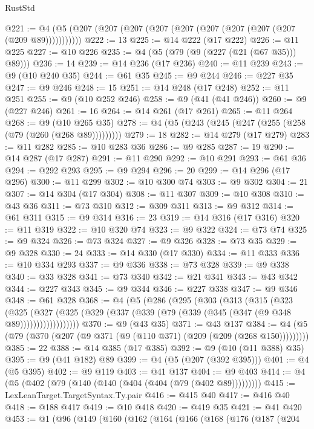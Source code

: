 \begin{lexlean}{RustStd}
\begin{coremodule}
{\begin{coremodule}
{{{{{{{{{{{{{{{{{{{{{{{{{{{{{{{{{@221 := @4 (@5 (@207 (@207 (@207 (@207 (@207 (@207 (@207 (@207 (@207 (@209 @89)))))))))))
@222 := 13
@225 := @14 @222 (@17 @222)
@226 := @11 @225
@227 := @10 @226
@235 := @4 (@5 (@79 (@9 (@227 (@21 (@67 @35))) @89)))
@236 := 14
@239 := @14 @236 (@17 @236)
@240 := @11 @239
@243 := @9 (@10 @240 @35)
@244 := @61 @35
@245 := @9 @244
@246 := @227 @35
@247 := @9 @246
@248 := 15
@251 := @14 @248 (@17 @248)
@252 := @11 @251
@255 := @9 (@10 @252 @246)
@258 := @9 (@41 (@41 @246))
@260 := @9 (@227 @246)
@261 := 16
@264 := @14 @261 (@17 @261)
@265 := @11 @264
@268 := @9 (@10 @265 @35)
@278 := @4 (@5 (@243 (@245 (@247 (@255 (@258 (@79 (@260 (@268 @89)))))))))
@279 := 18
@282 := @14 @279 (@17 @279)
@283 := @11 @282
@285 := @10 @283 @36
@286 := @9 @285
@287 := 19
@290 := @14 @287 (@17 @287)
@291 := @11 @290
@292 := @10 @291
@293 := @61 @36
@294 := @292 @293
@295 := @9 @294
@296 := 20
@299 := @14 @296 (@17 @296)
@300 := @11 @299
@302 := @10 @300 @74
@303 := @9 @302
@304 := 21
@307 := @14 @304 (@17 @304)
@308 := @11 @307
@309 := @10 @308
@310 := @43 @36
@311 := @73 @310
@312 := @309 @311
@313 := @9 @312
@314 := @61 @311
@315 := @9 @314
@316 := 23
@319 := @14 @316 (@17 @316)
@320 := @11 @319
@322 := @10 @320 @74
@323 := @9 @322
@324 := @73 @74
@325 := @9 @324
@326 := @73 @324
@327 := @9 @326
@328 := @73 @35
@329 := @9 @328
@330 := 24
@333 := @14 @330 (@17 @330)
@334 := @11 @333
@336 := @10 @334 @293
@337 := @9 @336
@338 := @73 @328
@339 := @9 @338
@340 := @33 @328
@341 := @73 @340
@342 := @21 @341
@343 := @43 @342
@344 := @227 @343
@345 := @9 @344
@346 := @227 @338
@347 := @9 @346
@348 := @61 @328
@368 := @4
    (@5
      (@286
        (@295
          (@303
            (@313
              (@315
                (@323
                  (@325
                    (@327
                      (@325 (@329 (@337 (@339 (@79 (@339 (@345 (@347 (@9 @348 @89))))))))))))))))))
@370 := @9 (@43 @35)
@371 := @43 @137
@384 := @4 (@5 (@79 (@370 (@207 (@9 @371 (@9 (@110 @371) (@209 (@209 (@268 @150)))))))))
@385 := 22
@388 := @14 @385 (@17 @385)
@392 := @9 (@10 (@11 @388) @35)
@395 := @9 (@41 @182) @89
@399 := @4 (@5 (@207 (@392 @395)))
@401 := @4 (@5 @395)
@402 := @9 @119
@403 := @41 @137
@404 := @9 @403
@414 := @4 (@5 (@402 (@79 (@140 (@140 (@404 (@404 (@79 (@402 @89)))))))))
@415 := LexLeanTarget.TargetSyntax.Ty.pair
@416 := @415 @40
@417 := @416 @40
@418 := @188 @417
@419 := @10 @418
@420 := @419 @35
@421 := @41 @420
@453 := @1
    (@96
      (@149
        (@160
          (@162
            (@164
              (@166
                (@168
                  (@176
                    (@187
                      (@204
}}}}}}}}}}}}}}}}}}}}}}}}}}}}}}}}}
\end{coremodule}}
\end{coremodule}
\end{lexlean}
